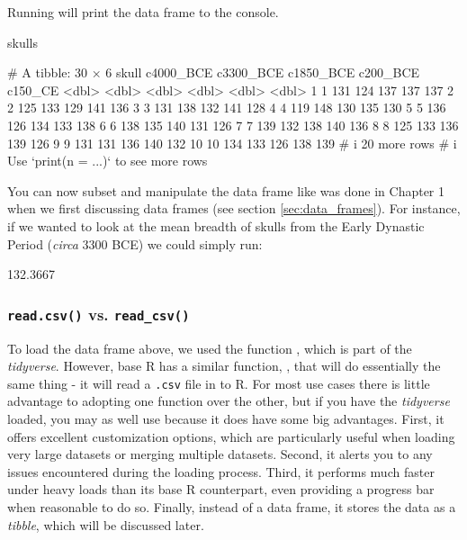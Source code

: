 Running  will print the data frame to the console.

\begin{inR}
skulls
\end{inR}

\begin{outR}
# A tibble: 30 × 6
   skull c4000_BCE c3300_BCE c1850_BCE c200_BCE c150_CE
   <dbl>     <dbl>     <dbl>     <dbl>    <dbl>   <dbl>
 1     1       131       124       137      137     137
 2     2       125       133       129      141     136
 3     3       131       138       132      141     128
 4     4       119       148       130      135     130
 5     5       136       126       134      133     138
 6     6       138       135       140      131     126
 7     7       139       132       138      140     136
 8     8       125       133       136      139     126
 9     9       131       131       136      140     132
10    10       134       133       126      138     139
# i 20 more rows
# i Use `print(n = ...)` to see more rows
\end{outR}

You can now subset and manipulate the data frame  like was done in Chapter 1 when we first discussing data frames (see section \ref{sec:data_frames}). For instance, if we wanted to look at the mean breadth of skulls from the Early Dynastic Period (\textit{circa} 3300 BCE) we could simply run:

\begin{outR}
[1] 132.3667
\end{outR}

\subsubsection{\texttt{read.csv()} vs. \texttt{read\_csv()}}

To load the  data frame above, we used the function , which is part of the \textit{tidyverse}. However, base R has a similar function, , that will do essentially the same thing - it will read a \texttt{.csv} file in to R. For most use cases there is little advantage to adopting one function over the other, but if you have the \textit{tidyverse} loaded, you may as well use  because it does have some big advantages. First, it offers excellent customization options, which are particularly useful when loading very large datasets or merging multiple datasets. Second, it alerts you to any issues encountered during the loading process. Third, it performs much faster under heavy loads than its base R counterpart, even providing a progress bar when reasonable to do so. Finally, instead of a data frame, it stores the data as a \textit{tibble}, which will be discussed later.

